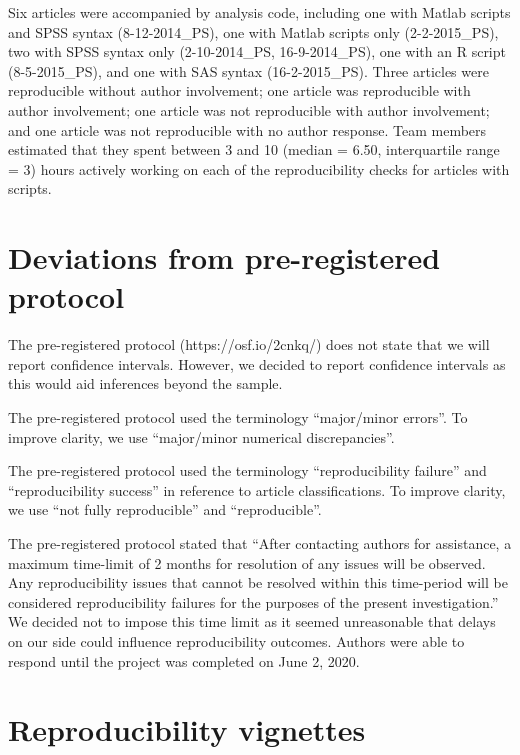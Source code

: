 \documentclass[english,,man,floatsintext]{apa6}
\begin{document}
\begin{appendix}
Six articles were accompanied by analysis code, including one with
Matlab scripts and SPSS syntax (8-12-2014\_PS), one with Matlab scripts
only (2-2-2015\_PS), two with SPSS syntax only (2-10-2014\_PS,
16-9-2014\_PS), one with an R script (8-5-2015\_PS), and one with SAS
syntax (16-2-2015\_PS). Three articles were reproducible without author
involvement; one article was reproducible with author involvement; one
article was not reproducible with author involvement; and one article
was not reproducible with no author response. Team members estimated
that they spent between 3 and 10 (median = 6.50, interquartile range =
3) hours actively working on each of the reproducibility checks for
articles with scripts.

\hypertarget{prereg}{%
\section{Deviations from pre-registered protocol}\label{prereg}}

The pre-registered protocol (https://osf.io/2cnkq/) does not state that
we will report confidence intervals. However, we decided to report
confidence intervals as this would aid inferences beyond the sample.

The pre-registered protocol used the terminology ``major/minor errors''.
To improve clarity, we use ``major/minor numerical discrepancies''.

The pre-registered protocol used the terminology ``reproducibility
failure'' and ``reproducibility success'' in reference to article
classifications. To improve clarity, we use ``not fully reproducible''
and ``reproducible''.

The pre-registered protocol stated that ``After contacting authors for
assistance, a maximum time-limit of 2 months for resolution of any
issues will be observed. Any reproducibility issues that cannot be
resolved within this time-period will be considered reproducibility
failures for the purposes of the present investigation.'' We decided not
to impose this time limit as it seemed unreasonable that delays on our
side could influence reproducibility outcomes. Authors were able to
respond until the project was completed on June 2, 2020.

\hypertarget{vignettes}{%
\section{Reproducibility vignettes}\label{vignettes}}


\end{appendix}
\end{document}
